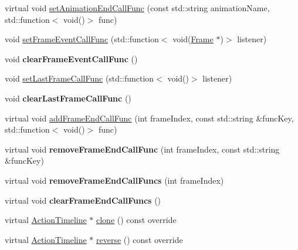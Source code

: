 \begin{DoxyCompactItemize}
\item 
virtual void \hyperlink{classActionTimeline_a12de94ac001f47cbc17fb0f58a093978}{set\+Animation\+End\+Call\+Func} (const std\+::string animation\+Name, std\+::function$<$ void()$>$ func)
\item 
void \hyperlink{classActionTimeline_ad1ab1387db4e1f8df9af2d0e339046f2}{set\+Frame\+Event\+Call\+Func} (std\+::function$<$ void(\hyperlink{classFrame}{Frame} $\ast$)$>$ listener)
\item 
\mbox{\label{classActionTimeline_a5708d72adbe16fa5669b4c00f6aef884}} 
void {\bfseries clear\+Frame\+Event\+Call\+Func} ()
\item 
void \hyperlink{classActionTimeline_a1c80f944675b1715d4a06053ebad51fd}{set\+Last\+Frame\+Call\+Func} (std\+::function$<$ void()$>$ listener)
\item 
\mbox{\label{classActionTimeline_a92c19bb7fd076b0cb1f5f5f2434c6d9e}} 
void {\bfseries clear\+Last\+Frame\+Call\+Func} ()
\item 
virtual void \hyperlink{classActionTimeline_a8385f00b011876132c1c0602fc72613a}{add\+Frame\+End\+Call\+Func} (int frame\+Index, const std\+::string \&func\+Key, std\+::function$<$ void()$>$ func)
\item 
\mbox{\label{classActionTimeline_ae76434d0168f099ac3f0d3757ba821d0}} 
virtual void {\bfseries remove\+Frame\+End\+Call\+Func} (int frame\+Index, const std\+::string \&func\+Key)
\item 
\mbox{\label{classActionTimeline_abee52ef0b5e23b3473c91c37f2d1a938}} 
virtual void {\bfseries remove\+Frame\+End\+Call\+Funcs} (int frame\+Index)
\item 
\mbox{\label{classActionTimeline_aaa5c8eca6b07dc513da4c72ccb0f427f}} 
virtual void {\bfseries clear\+Frame\+End\+Call\+Funcs} ()
\item 
virtual \hyperlink{classActionTimeline}{Action\+Timeline} $\ast$ \hyperlink{classActionTimeline_a13de8442dc106f192f3d5b3d5639842d}{clone} () const override
\item 
virtual \hyperlink{classActionTimeline}{Action\+Timeline} $\ast$ \hyperlink{classActionTimeline_ad242317b6d9108b0840cf535ea760786}{reverse} () const override
\item 

\end{DoxyCompactItemize}

